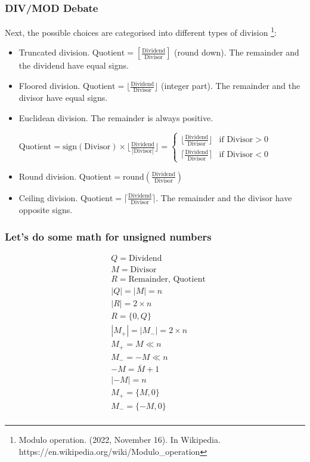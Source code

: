 \begin{frame}
    \frametitle{DIV/MOD Debate}
    Next, the possible choices are categorised into different types of division \footnote{Modulo operation. (2022, November 16). In Wikipedia. https://en.wikipedia.org/wiki/Modulo\_operation}:
    \begin{itemize}
        \item Truncated division. $\text{Quotient}=[\frac{\text{Dividend}}{\text{Divisor}}]$ (round down). The remainder and the dividend have equal signs.
        \item Floored division. $\text{Quotient}=\lfloor \frac{\text{Dividend}}{\text{Divisor}} \rfloor$ (integer part). The remainder and the divisor have equal signs.
        \item Euclidean division.  The remainder is always positive. \par  $\text{Quotient}=\text{sign}(\text{Divisor}) \times \lfloor  \frac{\text{Dividend}}{|\text{Divisor}|} \rfloor = \begin{cases}
             \lfloor  \frac{\text{Dividend}}{\text{Divisor}} \rfloor & \text{if } \text{Divisor}>0\\
             \lceil  \frac{\text{Dividend}}{\text{Divisor}} \rceil & \text{if } \text{Divisor}<0
        \end{cases}$
        \item Round division. $\text{Quotient}=\text{round}(\frac{\text{Dividend}}{\text{Divisor}})$
        \item Ceiling division. $\text{Quotient}=\lceil \frac{\text{Dividend}}{\text{Divisor}} \rceil$. The remainder and the divisor have opposite signs.
    \end{itemize}
\end{frame}

\begin{frame}
    \frametitle{Let's do some math for unsigned numbers}
    \begin{equation}
        \begin{aligned}
            &Q = \text{Dividend}\\
            &M = \text{Divisor}\\
            &R = \text{Remainder, Quotient}\\
            &|Q|=|M|=n\\
            &|R|=2 \times n\\
            &R=\{0,Q\}\\
            &|M_{+}|=|M_{-}|=2 \times n\\
            &M_{+}=M \ll n\\
            &M_{-}=-M \ll n\\
            &-M=\overline{M}+1\\
            &|-M|=n\\
            &M_{+}=\{M, 0\}\\
            &M_{-}=\{-M, 0\}\\
        \end{aligned}
    \end{equation}
\end{frame}

